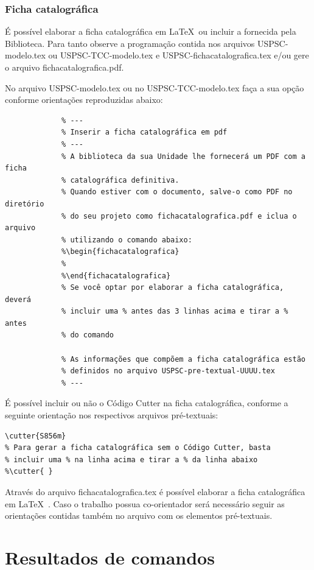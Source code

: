 \subsubsection{Ficha catalográfica}
É possível elaborar a ficha catalográfica em \LaTeX\ ou incluir a fornecida pela Biblioteca. Para tanto observe a programação contida nos arquivos USPSC-modelo.tex ou USPSC-TCC-modelo.tex  e USPSC-fichacatalografica.tex e/ou gere o arquivo fichacatalografica.pdf.
	  
No arquivo USPSC-modelo.tex ou no USPSC-TCC-modelo.tex faça a sua opção conforme orientações reproduzidas abaixo:

			 \begin{verbatim}
			 % ---
			 % Inserir a ficha catalográfica em pdf
			 % ---
			 % A biblioteca da sua Unidade lhe fornecerá um PDF com a ficha
			 % catalográfica definitiva. 
			 % Quando estiver com o documento, salve-o como PDF no diretório
			 % do seu projeto como fichacatalografica.pdf e iclua o arquivo
			 % utilizando o comando abaixo:
			 %\begin{fichacatalografica}
			 %   
			 %\end{fichacatalografica}
			 % Se você optar por elaborar a ficha catalográfica, deverá 
			 % incluir uma % antes das 3 linhas acima e tirar a % antes
			 % do comando 
			 
			 % As informações que compõem a ficha catalográfica estão 
			 % definidos no arquivo USPSC-pre-textual-UUUU.tex
			 % ---
			 \end{verbatim} 
			 				
É possível incluir ou não o Código Cutter na ficha catalográfica, conforme a seguinte orientação nos respectivos arquivos pré-textuais:

\begin{verbatim}
\cutter{S856m}
% Para gerar a ficha catalográfica sem o Código Cutter, basta 
% incluir uma % na linha acima e tirar a % da linha abaixo
%\cutter{ } 
\end{verbatim} 

Através do arquivo fichacatalografica.tex é possível elaborar a ficha catalográfica em \LaTeX\ . Caso o trabalho possua co-orientador será necessário seguir as orientações contidas também no arquivo com os elementos pré-textuais.	 


\section{Resultados de comandos}\label{sec-divisoes}

